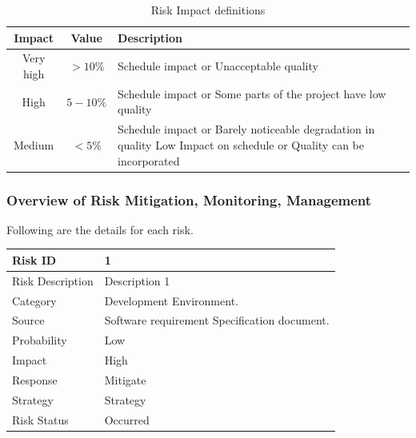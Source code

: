 \documentclass[12pt,a4paper]{article}
\begin{document}
\begin{table}[!htbp]
\begin{center}
\def\arraystretch{1.5}
\begin{tabularx}{\textwidth}{| c | c | X |}
\hline
Impact & Value	& Description \\ \hline
Very high &	$> 10 \%$ & Schedule impact or Unacceptable quality \\ \hline
High &	$5-10 \%$ & Schedule impact or Some parts of the project have low quality \\ \hline
Medium	& $ < 5 \% $ & Schedule impact or Barely noticeable degradation in quality Low	Impact on schedule or Quality can be incorporated \\ \hline
\end{tabularx}
\end{center}
\caption{Risk Impact definitions \cite{bookPressman}}
\label{tab:riskImpactDef}
\end{table}

\subsubsection{Overview of Risk Mitigation, Monitoring, Management}


Following are the details for each risk.
\begin{table}[!htbp]
\begin{center}
\def\arraystretch{1.5}
\begin{tabularx}{\textwidth}{| l | X |}
\hline 
Risk ID	& 1 \\ \hline
Risk Description	& Description 1 \\ \hline
Category	& Development Environment. \\ \hline
Source	& Software requirement Specification document. \\ \hline
Probability	& Low \\ \hline
Impact	& High \\ \hline
Response	& Mitigate \\ \hline
Strategy	& Strategy \\ \hline
Risk Status	& Occurred \\ \hline
\end{tabularx}
\end{center}
\label{tab:risk1}
\end{table}
\end{document}

